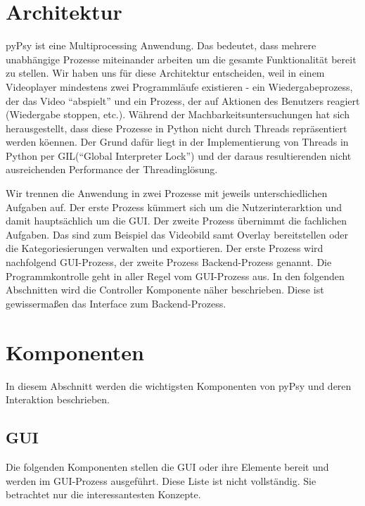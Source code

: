 \documentclass[a4paper,draft]{scrartcl}
\begin{document}
\section{Architektur}
pyPsy ist eine Multiprocessing Anwendung.
Das bedeutet, dass mehrere unabh\"angige Prozesse miteinander arbeiten um die gesamte Funktionalit\"at bereit zu stellen.
Wir haben uns f\"ur diese Architektur entscheiden, weil in einem Videoplayer mindestens zwei Programml\"aufe existieren - ein Wiedergabeprozess, der das Video "`abspielt"' und ein Prozess, der auf Aktionen des Benutzers reagiert (Wiedergabe stoppen, etc.). W\"ahrend der Machbarkeitsuntersuchungen hat sich herausgestellt, dass diese Prozesse in Python nicht durch Threads repr\"asentiert werden k\"oennen.
Der Grund daf\"ur liegt in der Implementierung von Threads in Python per GIL("`Global Interpreter Lock"') und der daraus resultierenden nicht ausreichenden Performance der Threadingl\"osung.

Wir trennen die Anwendung in zwei Prozesse mit jeweils unterschiedlichen Aufgaben auf.
Der erste Prozess k\"ummert sich um die Nutzerinterarktion und damit haupts\"achlich um die GUI.
Der zweite Prozess \"ubernimmt die fachlichen Aufgaben. Das sind zum Beispiel das Videobild samt Overlay bereitstellen oder die Kategoriesierungen verwalten und exportieren.
Der erste Prozess wird nachfolgend GUI-Prozess, der zweite Prozess Backend-Prozess genannt.
Die Programmkontrolle geht in aller Regel vom GUI-Prozess aus.
In den folgenden Abschnitten wird die Controller Komponente n\"aher beschrieben.
Diese ist gewisserma\ss en das Interface zum Backend-Prozess.

\section{Komponenten}
In diesem Abschnitt werden die wichtigsten Komponenten von pyPsy und deren Interaktion beschrieben.

\subsection{GUI}
Die folgenden Komponenten stellen die GUI oder ihre Elemente bereit und werden im GUI-Prozess ausgef\"uhrt.
Diese Liste ist nicht vollst\"andig.
Sie betrachtet nur die interessantesten Konzepte.
\end{document}
